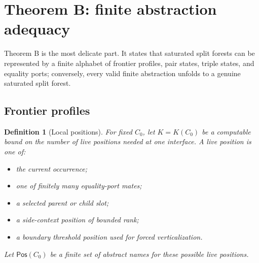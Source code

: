 \documentclass[11pt]{article}
\newtheorem{definition}[theorem]{Definition}
\newcommand{\Pos}{\mathsf{Pos}}
\begin{document}
\section{Theorem B: finite abstraction adequacy}

Theorem B is the most delicate part.  It states that saturated split forests can be represented by a finite alphabet of frontier profiles, pair states, triple states, and equality ports; conversely, every valid finite abstraction unfolds to a genuine saturated split forest.

\subsection{Frontier profiles}

\begin{definition}[Local positions]
For fixed $C_0$, let $K=K(C_0)$ be a computable bound on the number of live positions needed at one interface.  A live position is one of:
\begin{itemize}
\item the current occurrence;
\item one of finitely many equality-port mates;
\item a selected parent or child slot;
\item a side-context position of bounded rank;
\item a boundary threshold position used for forced verticalization.
\end{itemize}
Let $\Pos(C_0)$ be a finite set of abstract names for these possible live positions.
\end{definition}
\end{document}
